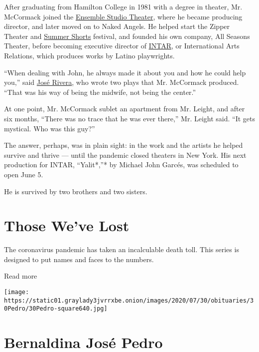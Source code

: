 After graduating from Hamilton College in 1981 with a degree in theater,
Mr. McCormack joined the
\href{https://www.ensemblestudiotheatre.org/}{Ensemble Studio Theater},
where he became producing director, and later moved on to Naked Angels.
He helped start the Zipper Theater and
\href{https://www.summershortsfestival.com/}{Summer Shorts} festival,
and founded his own company, All Seasons Theater, before becoming
executive director of \href{https://www.intartheatre.org/}{INTAR}, or
International Arts Relations, which produces works by Latino
playwrights.

``When dealing with John, he always made it about you and how he could
help you,'' said
\href{https://www.nytimes3xbfgragh.onion/2006/02/26/theater/newsandfeatures/jose-rivera.html}{José
Rivera}, who wrote two plays that Mr. McCormack produced. ``That was his
way of being the midwife, not being the center.''

At one point, Mr. McCormack sublet an apartment from Mr. Leight, and
after six months, ``There was no trace that he was ever there,'' Mr.
Leight said. ``It gets mystical. Who was this guy?''

The answer, perhaps, was in plain sight: in the work and the artists he
helped survive and thrive --- until the pandemic closed theaters in New
York. His next production for INTAR, ``Yalit*,''* by Michael John
Garcés, was scheduled to open June 5.

He is survived by two brothers and two sisters.

\href{https://www.nytimes3xbfgragh.onion/interactive/2020/obituaries/people-died-coronavirus-obituaries.html?action=click\&pgtype=Article\&state=default\&region=BELOW_MAIN_CONTENT\&context=covid_obits_promo}{}

\hypertarget{those-weve-lost}{%
\section{Those We've Lost}\label{those-weve-lost}}

The coronavirus pandemic has taken an incalculable death toll. This
series is designed to put names and faces to the numbers.

Read more

\texttt{[image: https://static01.graylady3jvrrxbe.onion/images/2020/07/30/obituaries/30Pedro/30Pedro-square640.jpg]}

\hypertarget{bernaldina-josuxe9-pedro}{%
\section{Bernaldina José Pedro}\label{bernaldina-josuxe9-pedro}}

